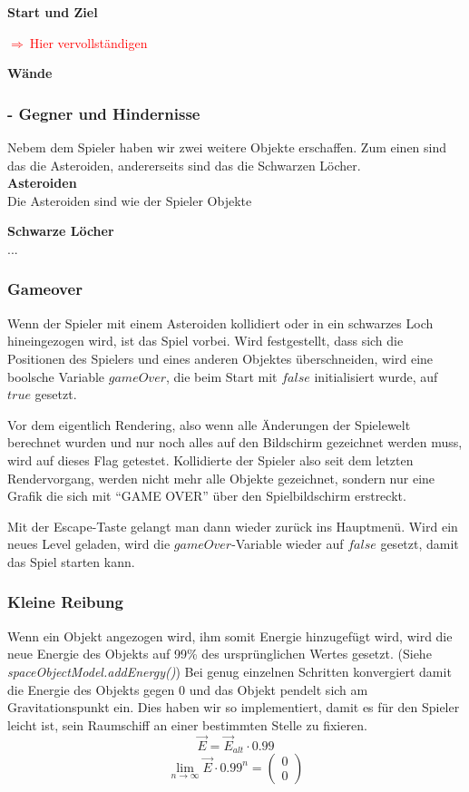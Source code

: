 \documentclass[12pt,a4paper]{scrartcl}
\newcommand{\q}[1]{``#1''}
\newcommand{\todo}[1]{\begin{Large}\textcolor{red}{$\Rightarrow ~$#1}\end{Large}}
\begin{document}
\textbf{Start und Ziel}
\\
\todo{Hier vervollständigen}
\textbf{Wände}

\subsubsection{- Gegner und Hindernisse}

Nebem dem Spieler haben wir zwei weitere Objekte erschaffen.
Zum einen sind das die Asteroiden, andererseits sind das die Schwarzen Löcher.		\\

\textbf{Asteroiden}		\\
Die Asteroiden sind wie der Spieler Objekte

\textbf{Schwarze Löcher}		\\
...


\subsubsection{Gameover}
Wenn der Spieler mit einem Asteroiden kollidiert oder in ein schwarzes Loch
hineingezogen wird, ist das Spiel vorbei. Wird festgestellt, dass sich die 
Positionen des Spielers und eines anderen Objektes überschneiden, wird eine boolsche
Variable $gameOver$, die beim Start mit $false$ initialisiert wurde, auf $true$ gesetzt.

Vor dem eigentlich Rendering, also wenn alle Änderungen der Spielewelt berechnet wurden
und nur noch alles auf den Bildschirm gezeichnet werden muss, wird auf dieses Flag getestet.
Kollidierte der Spieler also seit dem letzten Rendervorgang, werden nicht mehr alle Objekte
gezeichnet, sondern nur eine Grafik die sich mit \q{GAME OVER} über den Spielbildschirm erstreckt.

Mit der Escape-Taste gelangt man dann wieder zurück ins Hauptmenü. Wird ein neues Level geladen,
wird die $gameOver$-Variable wieder auf $false$ gesetzt, damit das Spiel starten kann.


\subsubsection{Kleine Reibung}
Wenn ein Objekt angezogen wird, ihm somit Energie hinzugefügt wird, wird die neue Energie des Objekts auf 99\%
des ursprünglichen Wertes gesetzt. (Siehe \textit{spaceObjectModel.addEnergy()}) Bei genug einzelnen Schritten konvergiert damit die Energie des Objekts gegen 0 und
das Objekt pendelt sich am Gravitationspunkt ein. Dies haben wir so implementiert, damit es für den Spieler leicht ist,
sein Raumschiff an einer bestimmten Stelle zu fixieren.
\[ \vec{E} = \vec{E}_{alt} \cdot 0.99 \]
\[ \lim_{n\rightarrow \infty} \vec{E} \cdot 0.99^n = \begin{pmatrix}0\\0\end{pmatrix} \] 
\end{document}
